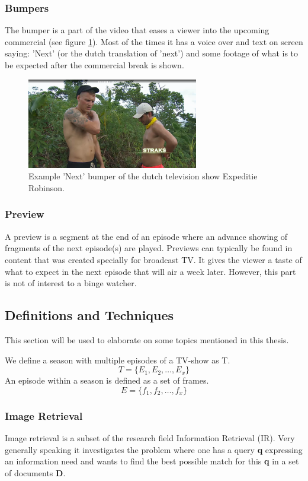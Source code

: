 \documentclass{article}
\begin{document}
\subsubsection{Bumpers}
The bumper is a part of the video that eases a viewer into the upcoming commercial (see figure \ref{examplebumper}). Most of the times it has a voice over and text on screen saying: 'Next' (or the dutch translation of 'next') and some footage of what is to be expected after the commercial break is shown.

\begin{figure}[H]
    \includegraphics[width=7.5cm]{images/straks.png}
    \centering
    \caption{Example 'Next' bumper of the dutch television show Expeditie Robinson.}
    \label{examplebumper}
\end{figure}

\subsubsection{Preview}
A preview is a segment at the end of an episode where an advance showing of fragments of the next episode(s) are played. Previews can typically be found in content that was created specially for broadcast TV. It gives the viewer a taste of what to expect in the next episode that will air a week later. However, this part is not of interest to a binge watcher.

\subsection{Definitions and Techniques}
This section will be used to elaborate on some topics mentioned in this thesis.

We define a season with multiple episodes of a TV-show as T.
\[T = \{E_1, E_2, \dots, E_x\}\]
An episode within a season is defined as a set of frames.
\[E = \{f_1, f_2, \dots, f_x\}\]


\subsubsection{Image Retrieval}
Image retrieval is a subset of the research field Information Retrieval (IR). Very generally speaking it investigates the problem where one has a query \textbf{q} expressing an information need and wants to find the best possible match for this \textbf{q} in a set of documents \textbf{D}.
\end{document}
